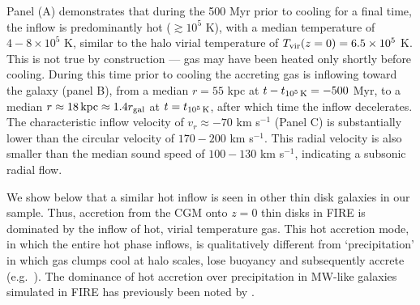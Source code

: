 \documentclass[fleqn,usenatbib]{mnras}
\newcommand{\tcools}{t_{10^5\,{\rm K}}}
\newcommand{\Tvir}{T_{\rm vir}}
\begin{document}
Panel (A) demonstrates that during the 500 Myr prior to cooling for a final time, the inflow is predominantly hot ($\gtrsim 10^5$ K), with a median temperature of $4-8\times10^5$ K, similar to the halo virial temperature of $\Tvir(z=0)=6.5\times10^5$ K.
This is not true by construction --- gas may have been heated only shortly before cooling.
During this time prior to cooling the accreting gas is inflowing toward the galaxy (panel B), from a median $r=55$ kpc at $t-\tcools=-500$ Myr, to a median $r\approx18\,{\rm kpc}\approx1.4 r_{\rm gal}$ at $t=\tcools$, after which time the inflow decelerates.
The characteristic inflow velocity of $v_r \approx-70$ km s$^{-1}$ (Panel C) is substantially lower than the circular velocity of $170-200$ km s$^{-1}$.
This radial velocity is also smaller than the median sound speed of $100-130$ km s$^{-1}$, indicating a subsonic radial flow. 


We show below that a similar hot inflow is seen in other thin disk galaxies in our sample.
Thus, accretion from the CGM onto $z=0$ thin disks in FIRE is dominated by the inflow of hot, virial temperature gas.
This hot accretion mode, in which the entire hot phase inflows, is qualitatively different from `precipitation' in which gas clumps cool at halo scales, lose buoyancy and subsequently accrete (e.g.~\citealt{Maller2004,Voit2017}). The dominance of hot accretion over precipitation in MW-like galaxies simulated in FIRE has previously been noted by \cite{Esmerian2021}. 
\end{document}
